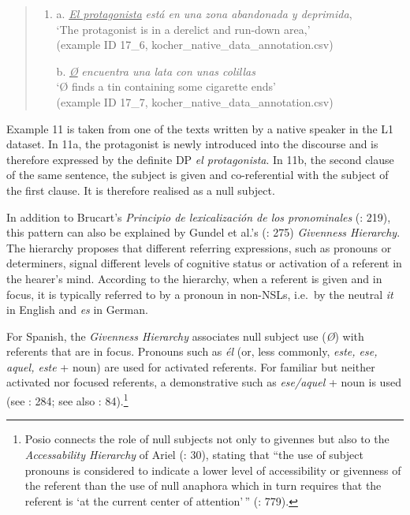 \documentclass[
  letterpaper,
  DIV=11,
  numbers=noendperiod]{scrartcl}
\begin{document}
\begin{quote}
\begin{enumerate}
\def\labelenumi{(\arabic{enumi})}
\setcounter{enumi}{10}
\item
  a. \ul{\emph{El protagonista}} \emph{está en una zona abandonada y
  deprimida},\\
  `The protagonist is in a derelict and run-down area,'\\
  (example ID 17\_6, kocher\_native\_data\_annotation.csv)

  b. \ul{\emph{Ø}} \emph{encuentra una lata con unas colillas}\\
  `Ø finds a tin containing some cigarette ends'\\
  (example ID 17\_7, kocher\_native\_data\_annotation.csv)
\end{enumerate}
\end{quote}

Example 11 is taken from one of the texts written by a native speaker in
the L1 dataset. In 11a, the protagonist is newly introduced into the
discourse and is therefore expressed by the definite DP \emph{el
protagonista}. In 11b, the second clause of the same sentence, the
subject is given and co-referential with the subject of the first
clause. It is therefore realised as a null subject.

In addition to Brucart's \emph{Principio de lexicalización de los
pronominales} (: 219), this
pattern can also be explained by Gundel et al.'s
(: 275) \emph{Givenness Hierarchy}. The
hierarchy proposes that different referring expressions, such as
pronouns or determiners, signal different levels of cognitive status or
activation of a referent in the hearer's mind. According to the
hierarchy, when a referent is given and in focus, it is typically
referred to by a pronoun in non-NSLs, i.e.~by the neutral \emph{it} in
English and \emph{es} in German.

For Spanish, the \emph{Givenness Hierarchy} associates null subject use
(\emph{Ø}) with referents that are in focus. Pronouns such as \emph{él}
(or, less commonly, \emph{este, ese, aquel, este} + noun) are used for
activated referents. For familiar but neither activated nor focused
referents, a demonstrative such as \emph{ese/aquel} + noun is used (see
: 284; see also
:
84).\footnote{Posio connects the role of null subjects not only to
  givennes but also to the \emph{Accessability Hierarchy} of Ariel
  (: 30), stating that ``the use of
  subject pronouns is considered to indicate a lower level of
  accessibility or givenness of the referent than the use of null
  anaphora which in turn requires that the referent is `at the current
  center of attention'\,'' (: 779).}
\end{document}
